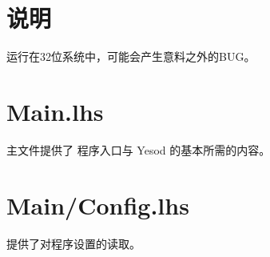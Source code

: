 










  \maketitle
  \newpage
  \tableofcontents
  \newpage

  \section{说明}
  运行在32位系统中，可能会产生意料之外的BUG。

  \section[程序主文件 Main.lhs文件]{Main.lhs}
  主文件提供了 程序入口与 Yesod 的基本所需的内容。
  

  \section[设置载入文件 Main/Config.lhs文件]{Main/Config.lhs}
  提供了对程序设置的读取。
  

